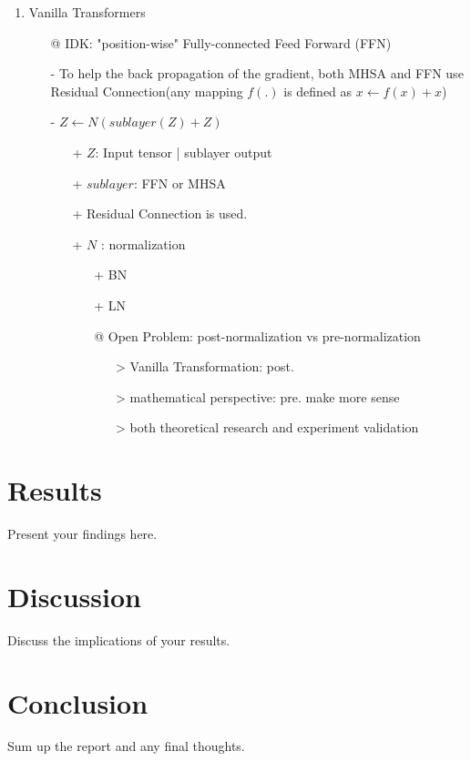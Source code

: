 \documentclass{article}
\begin{document}
\begin{enumerate}
\begin{itemize}
					
				\end{itemize}
		\item Vanilla Transformers
			\begin{itemize}
				\item[@] IDK: "position-wise" Fully-connected Feed Forward (FFN) 
				\item[-] To help the back propagation of the gradient, both MHSA and FFN use Residual Connection(any mapping $f(.)$ is defined as $x \longleftarrow f(x) + x$)
					
				\item[-] $ Z \longleftarrow N(sublayer(Z) + Z) $
					\begin{itemize}
						\item[+] $Z$: Input tensor | sublayer output
						\item[+] $sublayer$: FFN or MHSA
						\item[+] Residual Connection is used.
						\item[+] $N$ : normalization
						\begin{itemize}
							\item[+] BN
							\item[+] LN
							\item[@] Open Problem: post-normalization vs  pre-normalization 
								\begin{itemize}
									\item[>] Vanilla Transformation: post.
									\item[>] mathematical perspective: pre. make more sense
									\item[>] both theoretical research and experiment validation
								\end{itemize}
						\end{itemize}
						
					\end{itemize}

			\end{itemize}
	\end{enumerate}
	
	
	\section{Results}
	Present your findings here.
	
	\section{Discussion}
	Discuss the implications of your results.
	
	\section{Conclusion}
	Sum up the report and any final thoughts.
	
	
	
	
	
\end{document}
